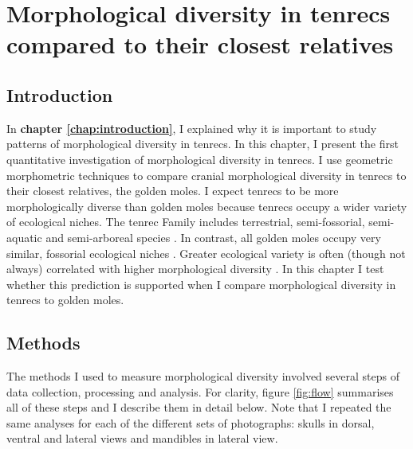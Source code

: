 \chapter{Morphological diversity in tenrecs compared to their closest relatives}
\label{chap:disparity}


\section{Introduction}
	In \textbf{chapter \ref{chap:introduction}}, I explained why it is important to study patterns of morphological diversity in tenrecs.  In this chapter, I present the first quantitative investigation of morphological diversity in tenrecs. I use geometric morphometric techniques \citep{Rohlf1993} to compare cranial morphological diversity in tenrecs to their closest relatives, the golden moles. 
	I expect tenrecs to be more morphologically diverse than golden moles because tenrecs occupy a wider variety of ecological niches. The tenrec Family includes terrestrial, semi-fossorial, semi-aquatic and semi-arboreal species \citep{Soarimalala2011}. In contrast, all golden moles occupy very similar, fossorial ecological niches \citep{Bronner1995}. 
	Greater ecological variety is often (though not always) correlated with higher morphological diversity \citep{Losos2010a}. In this chapter I test whether this prediction is supported when I compare morphological diversity in tenrecs to golden moles.


\section{Methods}

	The methods I used to measure morphological diversity involved several steps of data collection, processing and analysis. For clarity,  figure \ref{fig:flow} summarises all of these steps and I describe them in detail below. Note that I repeated the same analyses for each of the different sets of photographs: skulls in dorsal, ventral and lateral views and mandibles in lateral view.
	
